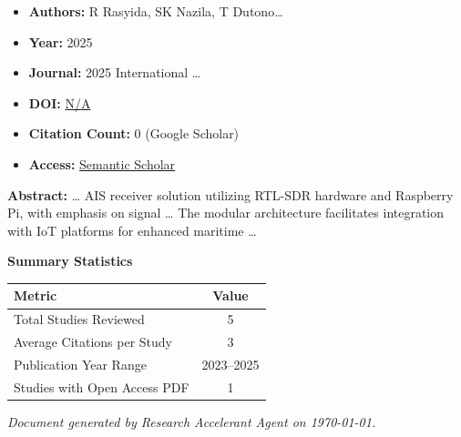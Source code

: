 \documentclass[11pt,a4paper]{article}
\begin{document}
\begin{resultbox}
\begin{itemize}[leftmargin=*]
    \item \textbf{Authors:} R Rasyida, SK Nazila, T Dutono…
    \item \textbf{Year:} 2025
    \item \textbf{Journal:} 2025 International …
    
    
    
    \item \textbf{DOI:} \href{https://doi.org/}{N/A}
    \item \textbf{Citation Count:} 0 (Google Scholar)
    \item \textbf{Access:} \href{https://ieeexplore.ieee.org/abstract/document/11161766/}{Semantic Scholar}
\end{itemize}
\end{resultbox}

\textbf{Abstract:} … AIS receiver solution utilizing RTL-SDR hardware and Raspberry Pi, with emphasis on signal … The modular architecture facilitates integration with IoT platforms for enhanced maritime …\par\vspace{0.5em}



\vspace{1em}
\textbf{\large Summary Statistics}\par\vspace{0.5em}

\begin{center}
\begin{tabular}{lc}
\toprule
\textbf{Metric} & \textbf{Value} \\
\midrule
Total Studies Reviewed & 5 \\
Average Citations per Study & 3 \\
Publication Year Range & 2023--2025 \\
Studies with Open Access PDF & 1 \\
\bottomrule
\end{tabular}
\end{center}


\vfill
\begin{center}
\textit{Document generated by Research Accelerant Agent on \today.}
\end{center}
\end{document}
